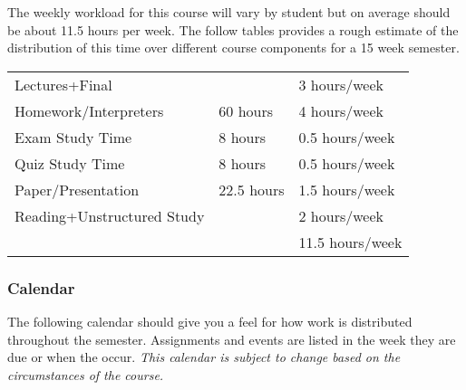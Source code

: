 \documentclass[10pt]{article}
\begin{document}
The weekly workload for this course will vary by student but on average should be about 11.5 hours per week.  The follow tables provides a rough estimate of the distribution of this time over different course components for a 15 week semester. 
\begin{center}
\begin{tabular}{|l|l|l|}
\hline
Lectures+Final &           & 3 hours/week \\ 
Homework/Interpreters & 60 hours  & 4 hours/week \\
Exam Study Time & 8 hours  & 0.5 hours/week \\ 
Quiz Study Time & 8 hours & 0.5 hours/week \\
Paper/Presentation & 22.5 hours & 1.5 hours/week \\
Reading+Unstructured Study & & 2 hours/week \\
\hline
& & 11.5 hours/week \\ 
\hline
\end{tabular}
\end{center}


\subsubsection{Calendar}

The following calendar should give you a feel for how work is distributed throughout the semester.  Assignments and events are listed in the week they are due or when the occur. \textit{This calendar is subject to change based on the circumstances of the course.}
\end{document}
